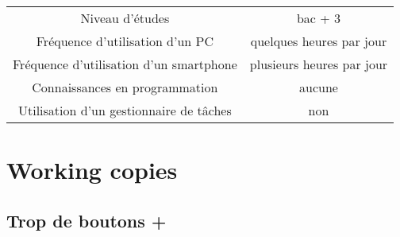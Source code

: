 \documentclass[11pt]{article}
\begin{document}
\begin{tabular}[h]{c|c}
  Niveau d'études & bac + 3\\
  Fréquence d'utilisation d'un PC & quelques heures par jour\\
  Fréquence d'utilisation d'un smartphone & plusieurs heures par jour\\
  Connaissances en programmation & aucune\\
  Utilisation d'un gestionnaire de tâches & non\\

\end{tabular}

\section{Working copies}

\subsection{Trop de boutons +}
\label{ann:plusplusplus}
\end{document}
